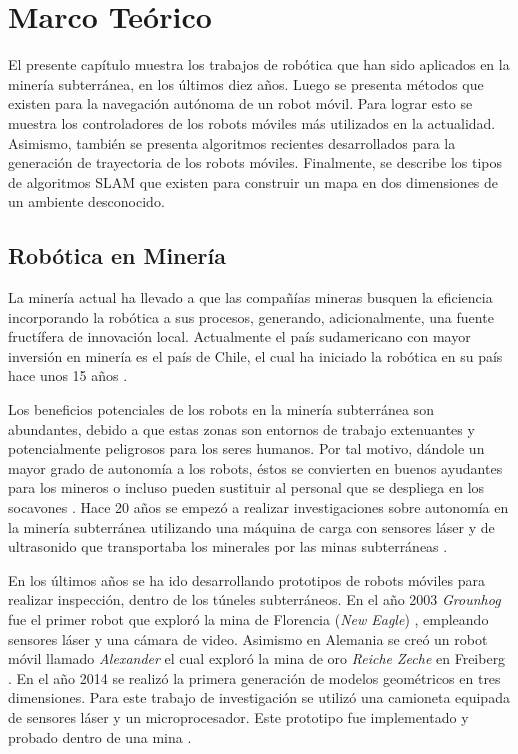 \chapter{Marco Teórico}
El presente capítulo muestra los trabajos de robótica que han sido aplicados en 
la minería subterránea, en los últimos diez años. Luego se presenta métodos
que existen para la navegación autónoma de un robot móvil. Para lograr esto se muestra
los controladores de los robots móviles más utilizados en la actualidad. Asimismo, también
se presenta algoritmos recientes desarrollados para la generación de trayectoria de 
los robots móviles. Finalmente, se describe los tipos de algoritmos SLAM que existen para 
construir un mapa en dos dimensiones de un ambiente desconocido.

\section{Rob\'otica en Miner\'ia}
La minería actual ha llevado a que las compañías mineras busquen la eficiencia 
incorporando la robótica a sus procesos, generando, adicionalmente, una fuente 
fructífera de innovación local. Actualmente el país sudamericano con mayor inversión 
en minería es el país de Chile, el cual ha iniciado la robótica en su país hace 
unos 15 años \cite{Carmona2014}.

Los beneficios potenciales de los robots en la minería subterránea son abundantes, debido 
a que estas zonas son entornos de trabajo extenuantes y potencialmente peligrosos para 
los seres humanos. Por tal motivo, dándole un mayor grado de autonomía a los robots, éstos 
se convierten en buenos ayudantes para los mineros o incluso pueden sustituir al personal 
que se despliega en los socavones \cite{Carmona2014}. Hace 20 años se empezó a realizar 
investigaciones sobre autonomía en la minería subterránea utilizando una máquina de carga 
con sensores láser y de ultrasonido que transportaba los minerales por las minas 
subterráneas \cite{Scheding1999}. 

En los últimos años se ha ido desarrollando prototipos de robots móviles para 
realizar inspección, dentro de los túneles subterráneos. En el año 2003 \textit{Grounhog}
fue el primer robot que exploró la mina de Florencia (\textit{New Eagle}) 
\cite{Thrun2004}, empleando sensores láser y una cámara de video. Asimismo en Alemania se 
creó un robot móvil llamado \textit{Alexander} el cual exploró la mina de oro 
\textit{Reiche Zeche} en Freiberg \cite{Grehl2015}. En el año 2014 se realizó la primera 
generación de modelos geométricos en tres dimensiones. Para este trabajo de investigación 
se utilizó una camioneta equipada de sensores láser y un microprocesador. Este prototipo 
fue implementado y probado dentro de una mina \cite{Zlot2014}.

